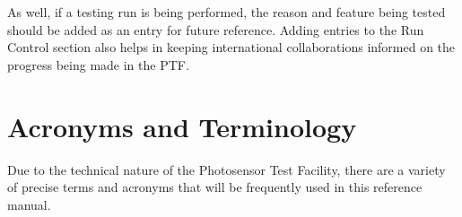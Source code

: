 \documentclass[twoside,letterpaper]{refart}
\begin{document}
As well, if a testing run is being performed, the reason and feature being tested should be added as an entry for future reference. Adding entries to the Run Control section also helps in keeping international collaborations informed on the progress being made in the PTF.

\newpage

\appendix

\section{Acronyms and Terminology}\label{Terminology}

Due to the technical nature of the Photosensor Test Facility, there are a variety of precise terms and acronyms that will be frequently used in this reference manual.
\end{document}
